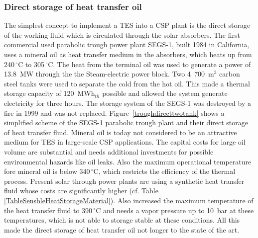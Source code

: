 \documentclass[Master,MEE,english]{twbook}%
\begin{document}
\subsubsection{Direct storage of heat transfer oil}
The simplest concept to implement a TES into a CSP plant is the direct storage of the working fluid which is circulated through the solar absorbers. The first commercial used parabolic trough power plant SEGS-1, built 1984 in California, uses a mineral oil as heat transfer medium in the absorbers, which heats up from 240$\,^{\circ}\mathrm{C}$ to 305$\,^{\circ}\mathrm{C}$. The heat from the terminal oil was used to generate a power of 13.8~MW through the the Steam-electric power block. Two 4~700~m$^3$ carbon steel  tanks were used to separate the cold from the hot oil. This made a thermal storage capacity of 120~MWh$_{th}$ possible and allowed the system generate electricity for three hours. The storage system of the SEGS-1 was destroyed by a fire in 1999 and was not replaced. Figure~\ref{troughdirecttwotank} shows a simplified scheme of the SEGS-1 parabolic trough plant and their direct storage of heat transfer fluid. Mineral oil is today not considered to be an attractive medium for TES in large-scale CSP applications. The capital costs for large oil volume are substantial and needs additional investments for possible environmental hazards like oil leaks. Also the maximum operational temperature fore mineral oil is below 340$\,^{\circ}\mathrm{C}$, which restricts the efficiency of the thermal process. Present solar through power plants are using a synthetic heat transfer fluid whose costs are significantly higher (cf. Table \ref{TableSensbleHeatStorageMaterial}). Also increased the maximum temperature of the heat transfer fluid to 390$\,^{\circ}\mathrm{C}$ and needs a vapor pressure up to 10~bar at these temperatures, which is not able to storage stable at these conditions. All this made the direct storage of heat transfer oil not longer to the state of the art. \cite{Richter2013}\\
\end{document}
